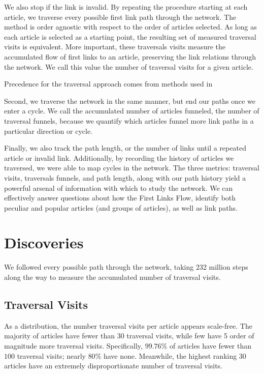 \documentclass[twoside]{article}
\newcommand{\red}[1]{{\leavevmode\color{sred}{#1}}} %
\begin{document}
We also stop if the link is invalid. 
By repeating the procedure starting at each article, we traverse
every possible first link path through the network.
The method is order agnostic with respect to the order of articles selected.
As long as each article is selected as a starting point, the resulting set of measured traversal visits is equivalent. 
More important, these traversals visits measure the accumulated flow of first 
links to an article, preserving the link relations through the network.
We call this value the number of traversal visits for a given article.

\red{[[expand, explain better]]}


Precedence for the traversal approach comes from methods used in \red{[[river networks? leaf pruning approach in environmental studies? what to cite?]]}

Second, we traverse the network in the same manner, but end our paths once we enter a cycle.
We call the accumulated number of articles funneled, the number of traversal funnels, because we quantify
which articles funnel more link paths in a particular direction or cycle.

Finally, we also track the path length, or the number of links until a repeated article or invalid link.
Additionally, by recording the history of articles we traversed, we were able to map cycles in the network.
The three metrics: traversal visits, traversals funnels, and path length, along with our path history
yield a powerful arsenal of information with which to study the network. 
We can effectively answer questions about how the First Links Flow, identify both peculiar and popular
articles (and groups of articles), as well as link paths.



\section{Discoveries}

We followed every possible path through the network, taking 232 million steps along the way to measure the accumulated number of traversal visits.

\subsection{Traversal Visits}

As a distribution, the number traversal visits per article appears scale-free. The majority of articles have fewer than 30 traversal visits, while few 
have 5 order of magnitude more traversal visits. 
Specifically, $99.76\%$ of articles have fewer than $100$ traversal visits; nearly $80\%$ have none. 
Meanwhile, the highest ranking 30 articles have an extremely disproportionate number of traversal visits.
\end{document}
